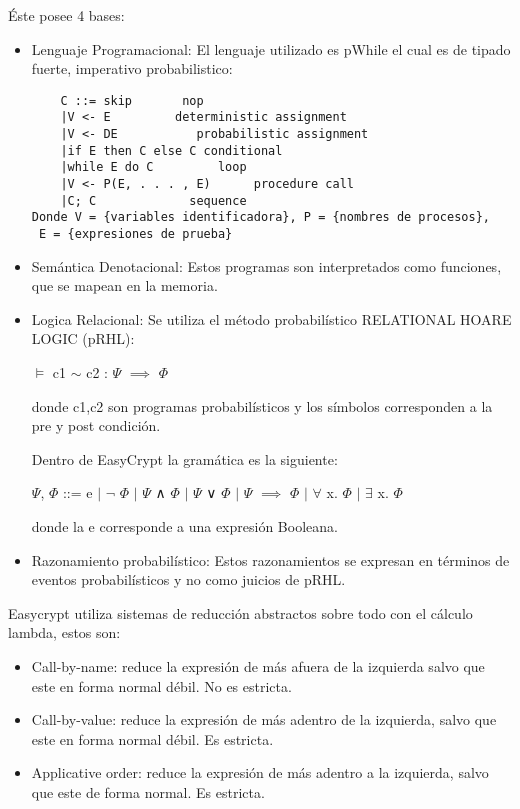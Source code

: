 \documentclass[runningheads,a4paper]{llncs}
\begin{document}
Éste posee 4 bases:
\begin{itemize}
	\item Lenguaje Programacional:
El lenguaje utilizado es pWhile el cual es de tipado fuerte, imperativo probabilistico:

\begin{Verbatim}
	C ::= skip		 nop
	|V <- E		    deterministic assignment
	|V <- DE		   probabilistic assignment
	|if E then C else C	conditional
	|while E do C	      loop
	|V <- P(E, . . . , E)      procedure call
	|C; C		      sequence
Donde V = {variables identificadora}, P = {nombres de procesos},
 E = {expresiones de prueba}
\end{Verbatim}

	\item Semántica Denotacional:
Estos programas son interpretados como funciones, que se mapean en la memoria.

	\item Logica Relacional: Se utiliza el método probabilístico RELATIONAL HOARE LOGIC (pRHL):
		
\centerline{$\models$ c1 $\sim$ c2 : $\Psi$ $\implies$ $\Phi$}	
			
donde c1,c2 son programas probabilísticos y los símbolos corresponden a la pre y post condición.

Dentro de EasyCrypt la gramática es la siguiente:

\centerline{$\Psi$, $\Phi$ ::= e $\mid$ $\neg$ $\Phi$ $\mid$ $\Psi$ ∧ $\Phi$ $\mid$ $\Psi$ ∨ $\Phi$ $\mid$ $\Psi$ $\implies$ $\Phi$ $\mid$ $\forall$ x. $\Phi$ $\mid$ $\exists$ x. $\Phi$}

donde la e corresponde a una expresión Booleana.


	\item Razonamiento probabilístico:
Estos razonamientos se expresan en términos de eventos probabilísticos y no como juicios de pRHL.\cite{article3}
\end{itemize}

Easycrypt utiliza sistemas de reducción abstractos sobre todo con el cálculo lambda, estos son:

\begin{itemize}

	\item Call-by-name: reduce la expresión de más afuera de la izquierda salvo que este en forma normal débil. No es estricta.

	\item Call-by-value: reduce la expresión de más adentro de la izquierda, salvo que este en forma normal débil. Es estricta.

	\item Applicative order: reduce la expresión de más adentro a la izquierda, salvo que este de forma normal. Es estricta.
\end{itemize}
\end{document}
